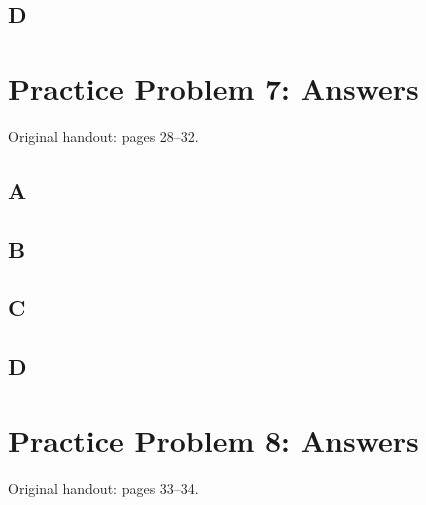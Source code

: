 \documentclass[letterpaper,12pt]{article}
\newcommand{\handout}[1]{%
  
}
\newenvironment{answer}{\par}{\par\medskip}
\begin{document}
\subsection*{D}
\begin{answer}
  \vspace{2cm}
\end{answer}

\clearpage

\handout{28-32}
\section*{Practice Problem 7: Answers}
\noindent Original handout: pages 28--32.\par

\subsection*{A}
\begin{answer}
  \vspace{2cm}
\end{answer}

\subsection*{B}
\begin{answer}
  \vspace{2cm}
\end{answer}

\subsection*{C}
\begin{answer}
  \vspace{2cm}
\end{answer}

\subsection*{D}
\begin{answer}
  \vspace{2cm}
\end{answer}

\clearpage

\handout{33-34}
\section*{Practice Problem 8: Answers}
\noindent Original handout: pages 33--34.\par
\end{document}
